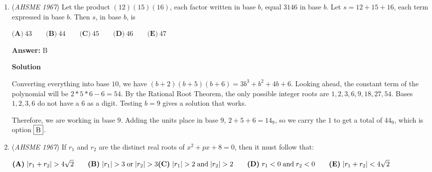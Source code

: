 \begin{enumerate}
\textbf{Solution}

If the areas of the two triangles are $A_1$ and $A_2$ with $A_1 > A_2$, we are given that $A_1 - A_2 = 18$ and $\frac{A_1}{A_2} = k^2$

 Plugging in the second equation into the first leads to $(k^2 - 1)A_2 = 18$.  

 If $A_2$ is an integer, it can only be a factor of $18$ - namely $1, 2, 3, 6, 9, 18$.  

 Since $A_1 = A_2 + 18$, this would lead to $A_1 = 19, 20, 21, 24, 27, 36$.  

 This would lead to $\frac{A_1}{A_2} = 19, 10, 7, 4, 3, 2$, and the only square is $4$.  

 Thus, the ratio of the areas is $4$, and hence the ratio of the sides is $\sqrt{4} = 2$.  The corresponding side has a length of $3 \cdot 2 = 6$, which is option $\fbox{D}$.

 


	\item (\textit{AHSME 1967}) Let the product $(12)(15)(16)$, each factor written in base $b$, equal $3146$ in base $b$.  Let $s=12+15+16$, each term expressed in base $b$.  Then $s$, in base $b$, is 


 $\textbf{(A)}\ 43\qquad \textbf{(B)}\ 44\qquad \textbf{(C)}\ 45\qquad \textbf{(D)}\ 46\qquad \textbf{(E)}\ 47$

 \textbf{Answer: }B



\textbf{Solution}

Converting everything into base $10$, we have $(b + 2)(b+5)(b+6) = 3b^3 + b^2 + 4b + 6$.  Looking ahead, the constant term of the polynomial will be $2*5*6 -6 = 54$. By the Rational Root Theorem, the only possible integer roots are $1, 2, 3, 6, 9, 18, 27, 54$.  Bases $1, 2, 3, 6$ do not have a $6$ as a digit.  Testing $b=9$ gives a solution that works.

 Therefore, we are working in base $9$.  Adding the units place in base $9$, $2 + 5 + 6 = 14_9$, so we carry the $1$ to get a total of $44_9$, which is option $\fbox{B}$.

 


	\item (\textit{AHSME 1967}) If $r_1$ and $r_2$ are the distinct real roots of $x^2+px+8=0$, then it must follow that:


 $\textbf{(A)}\ |r_1+r_2|>4\sqrt{2}\qquad \textbf{(B)}\ |r_1|>3 \; \text{or} \; |r_2| >3 \\ \textbf{(C)}\ |r_1|>2 \; \text{and} \; |r_2|>2\qquad \textbf{(D)}\ r_1<0 \; \text{and} \; r_2<0\qquad \textbf{(E)}\ |r_1+r_2|<4\sqrt{2}$


\end{enumerate}
